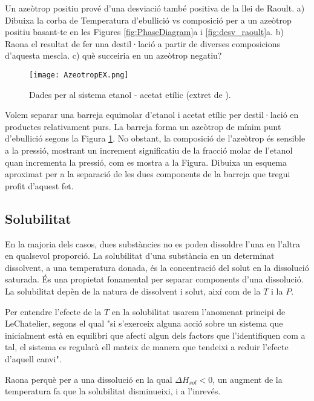 \begin{exr}
Un azeòtrop positiu prové d'una desviació també positiva de la llei de Raoult. a) Dibuixa la corba de Temperatura d'ebullició vs composició per a un azeòtrop positiu basant-te en les Figures \ref{fig:PhaseDiagram}a i \ref{fig:desv_raoult}a. b) Raona el resultat de fer una destil·lació a partir de diverses composicions d'aquesta mescla. c) què succeiria en un azeòtrop negatiu?
\end{exr}
\begin{figure}[h]
\centering
\texttt{[image: AzeotropEX.png]}
\caption{Dades per al sistema etanol - acetat etílic (extret de \cite{Robin2016}).}
\label{fig:AzeotropEX}
\end{figure}
\begin{exr}
Volem separar una barreja equimolar d'etanol i acetat etílic per destil·lació en productes relativament purs. La barreja forma un azeòtrop de mínim punt d'ebullició segons la Figura \ref{fig:AzeotropEX}. No obstant, la composició de l'azeòtrop és sensible a la pressió, mostrant un increment significatiu de la fracció molar de l'etanol quan incrementa la pressió, com es mostra a la Figura. Dibuixa un esquema aproximat per a la separació de les dues components de la barreja que tregui profit d'aquest fet.
\end{exr}

\subsection{Solubilitat}

En la majoria dels casos, dues substàncies no es poden dissoldre l'una en l'altra en qualsevol proporció.
La solubilitat d'una substància en un determinat dissolvent, a una temperatura donada, és la concentració del solut en la dissolució saturada.
És una propietat fonamental per separar components d'una dissolució.
La solubilitat depèn de la natura de dissolvent i solut, així com de la $T$ i la $P$.

Per entendre l'efecte de la $T$ en la solubilitat usarem l'anomenat principi de LeChatelier, segons el qual "si s'exerceix alguna acció sobre un sistema que inicialment està en equilibri que afecti algun dels factors que l'identifiquen com a tal, el sistema es regularà ell mateix de manera que tendeixi a reduir l'efecte d'aquell canvi".
\begin{exr}
Raona perquè per a una dissolució en la qual $\Delta H_{sol} <0$, un augment de la temperatura fa que la solubilitat disminueixi, i a l'inrevés.
\end{exr}

